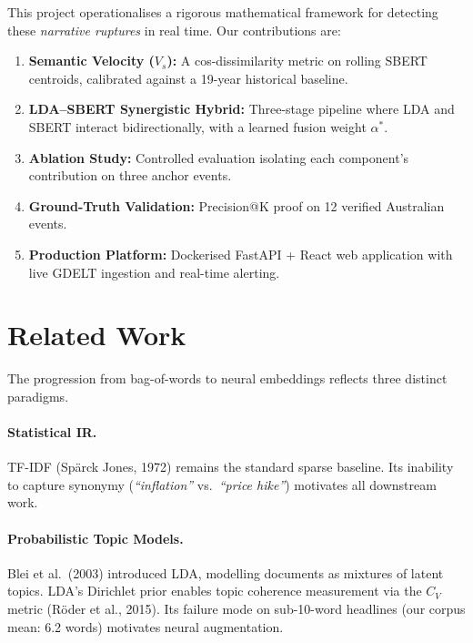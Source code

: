 \documentclass[12pt,a4paper]{article}
\begin{document}
This project operationalises a rigorous mathematical framework for detecting these
\emph{narrative ruptures} in real time. Our contributions are:

\begin{enumerate}[leftmargin=2em]
    \item \textbf{Semantic Velocity ($V_s$):} A cos-dissimilarity metric on rolling SBERT
          centroids, calibrated against a 19-year historical baseline.
    \item \textbf{LDA--SBERT Synergistic Hybrid:} Three-stage pipeline where LDA and SBERT
          interact bidirectionally, with a learned fusion weight $\alpha^*$.
    \item \textbf{Ablation Study:} Controlled evaluation isolating each component's
          contribution on three anchor events.
    \item \textbf{Ground-Truth Validation:} Precision@K proof on 12 verified Australian events.
    \item \textbf{Production Platform:} Dockerised FastAPI + React web application with
          live GDELT ingestion and real-time alerting.
\end{enumerate}

\section{Related Work}

The progression from bag-of-words to neural embeddings reflects three distinct paradigms.

\paragraph{Statistical IR.}
TF-IDF (Spärck Jones, 1972) remains the standard sparse baseline. Its inability to capture
synonymy (\emph{``inflation''} vs.\ \emph{``price hike''}) motivates all downstream work.

\paragraph{Probabilistic Topic Models.}
Blei et al.\ (2003) introduced LDA, modelling documents as mixtures of latent topics.
LDA's Dirichlet prior enables topic coherence measurement via the $C_V$ metric (Röder
et al., 2015). Its failure mode on sub-10-word headlines (our corpus mean: 6.2 words)
motivates neural augmentation.
\end{document}
